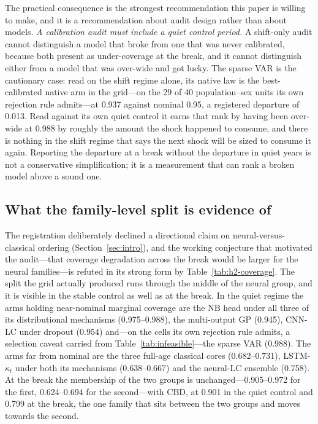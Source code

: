 The practical consequence is the strongest recommendation this paper is
willing to make, and it is a recommendation about audit design rather
than about models. \emph{A calibration audit must include a quiet control
period.} A shift-only audit cannot distinguish a model that broke from
one that was never calibrated, because both present as under-coverage at
the break, and it cannot distinguish either from a model that was
over-wide and got lucky. The sparse VAR is the cautionary case: read on
the shift regime alone, its native law is the best-calibrated native arm
in the grid---on the 29 of 40 population--sex units its own rejection
rule admits---at 0.937 against nominal 0.95, a registered departure of
0.013. Read against its own quiet control it earns that rank by having
been over-wide at 0.988 by roughly the amount the shock happened to
consume, and there is nothing in the shift regime that says the next
shock will be sized to consume it again. Reporting the departure at a
break without the departure in quiet years is not a conservative
simplification; it is a measurement that can rank a broken model above a
sound one.

\subsection{What the family-level split is evidence of}
\label{sec:discussion-split}

The registration deliberately declined a directional claim on
neural-versus-classical ordering (Section~\ref{sec:intro}), and
the working conjecture that motivated the audit---that coverage
degradation across the break would be larger for the neural
families---is refuted in its strong form by Table~\ref{tab:h2-coverage}.
The split the grid actually produced runs through the middle of the
neural group, and it is visible in the stable control as well as at the
break. In the quiet regime the arms holding near-nominal marginal
coverage are the NB head under all three of its distributional
mechanisms (0.975--0.988), the multi-output GP (0.945), CNN-LC under dropout
(0.954) and---on the cells its own rejection rule admits, a selection
caveat carried from Table~\ref{tab:infeasible}---the sparse VAR (0.988).
The arms far from nominal are the three full-age classical cores
(0.682--0.731), LSTM-$\kappa_t$ under both its mechanisms (0.638--0.667)
and the neural-LC ensemble (0.758). At the break the membership of the
two groups is unchanged---0.905--0.972 for the first, 0.624--0.694 for
the second---with CBD, at 0.901 in the quiet control and 0.799 at the
break, the one family that sits between the two groups and moves towards
the second.

